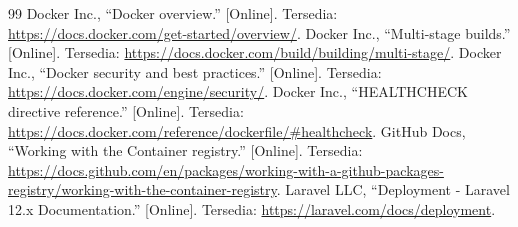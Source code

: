 \documentclass[a4paper,oneside,12pt]{report}
\begin{document}
\clearpage

\begin{thebibliography}{99}
     Docker Inc., ``Docker overview.'' [Online]. Tersedia: \url{https://docs.docker.com/get-started/overview/}.
     Docker Inc., ``Multi-stage builds.'' [Online]. Tersedia: \url{https://docs.docker.com/build/building/multi-stage/}.
     Docker Inc., ``Docker security and best practices.'' [Online]. Tersedia: \url{https://docs.docker.com/engine/security/}.
     Docker Inc., ``HEALTHCHECK directive reference.'' [Online]. Tersedia: \url{https://docs.docker.com/reference/dockerfile/#healthcheck}.
     GitHub Docs, ``Working with the Container registry.'' [Online]. Tersedia: \url{https://docs.github.com/en/packages/working-with-a-github-packages-registry/working-with-the-container-registry}.
     Laravel LLC, ``Deployment - Laravel 12.x Documentation.'' [Online]. Tersedia: \url{https://laravel.com/docs/deployment}.
\end{thebibliography}
\end{document}

